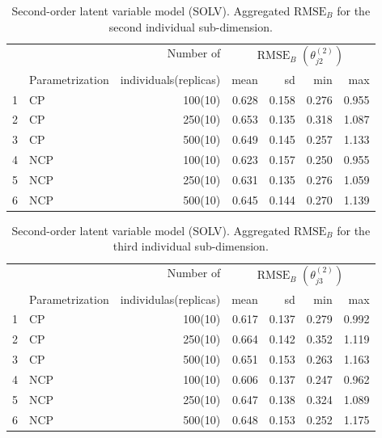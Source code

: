\begin{table}[H]
	\centering
	\begin{tabular}{rlrrrrr}
		\hline
		\multicolumn{2}{c}{ } & Number of & \multicolumn{4}{c}{ $\text{RMSE}_{B}$ $( \theta^{(2)}_{j2} )$ } \\ 
		\cmidrule(rl){4-7}
		& Parametrization & individuals(replicas) & mean & sd & min & max \\  
		\hline\hline
		1 & CP &  100(10) & 0.628 & 0.158 & 0.276 & 0.955 \\  
		2 & CP &  250(10) & 0.653 & 0.135 & 0.318 & 1.087 \\  
		3 & CP &  500(10) & 0.649 & 0.145 & 0.257 & 1.133 \\  
		\hline
		4 & NCP &  100(10) & 0.623 & 0.157 & 0.250 & 0.955 \\ 
		5 & NCP &  250(10) & 0.631 & 0.135 & 0.276 & 1.059 \\  
		6 & NCP &  500(10) & 0.645 & 0.144 & 0.270 & 1.139 \\  
		\hline
	\end{tabular}
	\caption[Second-order latent variable model (SOLV). Aggregated $\text{RMSE}_{B}$ for the second individual sub-dimension.]%
	{Second-order latent variable model (SOLV). Aggregated $\text{RMSE}_{B}$ for the second individual sub-dimension.}
	\label{tab:SOLV_RMSE_theta2}
\end{table}
%
\begin{table}[H]
	\centering
	\begin{tabular}{rlrrrrr}
		\hline
		\multicolumn{2}{c}{ } & Number of & \multicolumn{4}{c}{ $\text{RMSE}_{B}$ $( \theta^{(2)}_{j3} )$ } \\ 
		\cmidrule(rl){4-7}
		& Parametrization & individulas(replicas) & mean & sd & min & max \\  
		\hline\hline
		1 & CP &  100(10) & 0.617 & 0.137 & 0.279 & 0.992 \\  
		2 & CP &  250(10) & 0.664 & 0.142 & 0.352 & 1.119 \\  
		3 & CP &  500(10) & 0.651 & 0.153 & 0.263 & 1.163 \\ 
		\hline
		4 & NCP &  100(10) & 0.606 & 0.137 & 0.247 & 0.962 \\ 
		5 & NCP &  250(10) & 0.647 & 0.138 & 0.324 & 1.089 \\ 
		6 & NCP &  500(10) & 0.648 & 0.153 & 0.252 & 1.175 \\   
		\hline
	\end{tabular}
	\caption[Second-order latent variable model (SOLV). Aggregated $\text{RMSE}_{B}$ for the third individual sub-dimension.]%
	{Second-order latent variable model (SOLV). Aggregated $\text{RMSE}_{B}$ for the third individual sub-dimension.}
	\label{tab:SOLV_RMSE_theta3}
\end{table}
